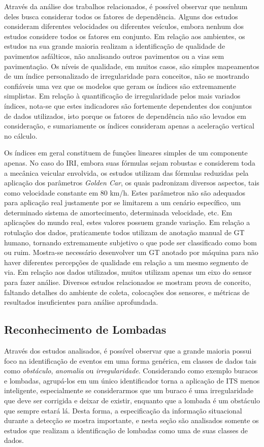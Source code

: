Através da análise dos trabalhos relacionados, é possível observar que nenhum deles busca considerar todos os fatores de dependência. Alguns dos estudos consideram diferentes velocidades ou diferentes veículos, embora nenhum dos estudos considere todos os fatores em conjunto. Em relação aos ambientes, os estudos na sua grande maioria realizam a identificação de qualidade de pavimentos asfálticos, não analisando outros pavimentos ou a vias sem pavimentação. Os níveis de qualidade, em muitos casos, são simples mapeamentos de um índice personalizado de irregularidade para conceitos, não se mostrando confiáveis uma vez que os modelos que geram os índices são extremamente simplistas. Em relação à quantificação de irregularidade pelos mais variados índices, nota-se que estes indicadores são fortemente dependentes dos conjuntos de dados utilizados, isto porque os fatores de dependência não são levados em consideração, e sumariamente os índices consideram apenas a aceleração vertical no cálculo. 

Os índices em geral constituem de funções lineares simples de um componente apenas. No caso do IRI, embora suas fórmulas sejam robustas e considerem toda a mecânica veicular envolvida, os estudos utilizam das fórmulas reduzidas pela aplicação dos parâmetros \textit{Golden Car}, os quais padronizam diversos aspectos, tais como velocidade constante em 80 km/h. Estes parâmetros não são adequados para aplicação real justamente por se limitarem a um cenário específico, um determinado sistema de amortecimento, determinada velocidade, etc. Em aplicações do mundo real, estes valores possuem grande variação. Em relação a rotulação dos dados, praticamente todos utilizam de anotação manual de GT humano, tornando extremamente subjetivo o que pode ser classificado como bom ou ruim. Mostra-se necessário desenvolver um GT anotado por máquina para não haver diferentes percepções de qualidade em relação a um mesmo segmento de via. Em relação aos dados utilizados, muitos utilizam apenas um eixo do sensor para fazer análise.  Diversos estudos relacionados se mostram prova de conceito, faltando detalhes do ambiente de coleta, colocações dos sensores, e métricas de resultados insuficientes para análise aprofundada.

\subsection{Reconhecimento de Lombadas}

Através dos estudos analisados, é possível observar que a grande maioria possui foco na identificação de eventos em uma forma genérica, em classes de dados tais como \emph{obstáculo}, \emph{anomalia} ou \emph{irregularidade}. Considerando como exemplo buracos e lombadas, agrupá-los em um único identificador torna a aplicação de ITS menos inteligente, especialmente se considerarmos que um buraco é uma irregularidade que deve ser corrigida e deixar de existir, enquanto que a lombada é um obstáculo que sempre estará lá. Desta forma, a especificação da informação situacional durante a detecção se mostra importante, e nesta seção são analisados somente os estudos que realizam a identificação de lombadas como uma de suas classes de dados.

